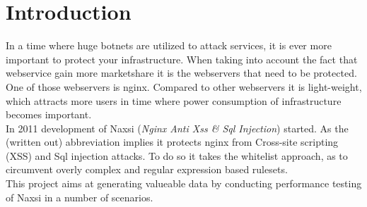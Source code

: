 \documentclass[Introduction]{subfiles}
\begin{document}
\section{Introduction}
\label{sec:Introduction}
In a time where huge botnets are utilized to attack services, it is ever more
important to protect your infrastructure. When taking into account the fact that
webservice gain more marketshare it is the webservers that need to be
protected. One of those webservers is nginx. Compared to other webservers it is
light-weight, which attracts more users in time where power consumption of
infrastructure becomes important. \\
In 2011 development of Naxsi (\emph{Nginx Anti Xss \& Sql Injection}) started. As the (written
out) abbreviation implies it protects nginx from Cross-site scripting (XSS) and Sql
injection attacks. To do so it takes the whitelist approach, as to circumvent overly
complex and regular expression based rulesets. \\
This project aims at generating valueable data by conducting performance testing
of Naxsi in a number of scenarios.
\end{document}
